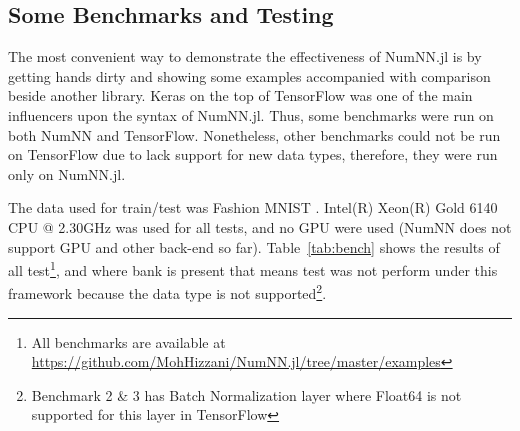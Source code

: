 
\subsection{Some Benchmarks and Testing}
The most convenient way to demonstrate the effectiveness of NumNN.jl is by getting hands dirty and showing some examples accompanied with comparison beside another library. Keras on the top of TensorFlow was one of the main influencers upon the syntax of NumNN.jl. Thus, some benchmarks were run on both NumNN and TensorFlow. Nonetheless, other benchmarks could not be run on TensorFlow due to lack support for new data types, therefore, they were run only on NumNN.jl.

The data used for train/test was Fashion MNIST \cite{Xiao2017}. Intel(R) Xeon(R) Gold 6140 CPU @ 2.30GHz was used for all tests, and no GPU were used (NumNN does not support GPU and other back-end so far). Table~\ref{tab:bench} shows the results of all test\footnote{All benchmarks are available at \url{https://github.com/MohHizzani/NumNN.jl/tree/master/examples}}, and where bank is present that means test was not perform under this framework because the data type is not supported\footnote{\label{batchnorm}Benchmark 2 \& 3 has Batch Normalization layer where Float64 is not supported for this layer in TensorFlow}.

